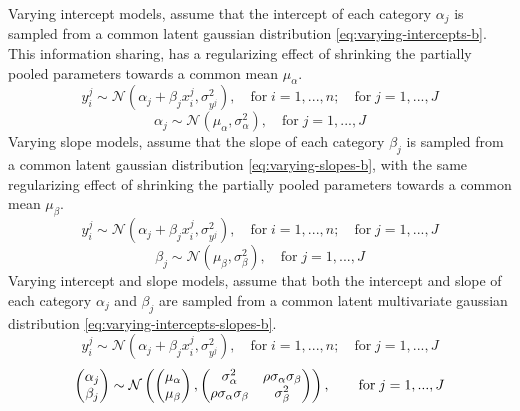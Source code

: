 \documentclass[english,msc,numbers]{coppe}
\begin{document}
  Varying intercept models, assume that the intercept of each category \(\alpha_j\) is sampled from a common latent gaussian distribution \eqref{eq:varying-intercepts-b}. This information sharing, has a regularizing effect of shrinking the partially pooled parameters towards a common mean \(\mu_\alpha\).
  \begin{equation} 
    y_i^j \sim \mathcal{N}(\alpha_j + \beta_j x_i^j, \sigma_{y^j}^2),\quad \text{for}\; i=1,...,n; \quad \text{for} \; j=1,...,J
    \label{eq:varying-intercepts-a}
  \end{equation}
  \begin{equation} 
    \alpha_j \sim \mathcal{N}(\mu_\alpha, \sigma_\alpha^2), \quad \text{for} \; j=1,...,J
    \label{eq:varying-intercepts-b}
  \end{equation}
  Varying slope models, assume that the slope of each category \(\beta_j\) is sampled from a common latent gaussian distribution \eqref{eq:varying-slopes-b}, with the same regularizing effect of shrinking the partially pooled parameters towards a common mean \(\mu_\beta\).
  \begin{equation} 
    y_i^j \sim \mathcal{N}(\alpha_j + \beta_j x_i^j, \sigma_{y^j}^2),\quad \text{for}\; i=1,...,n; \quad \text{for} \; j=1,...,J
    \label{eq:varying-slopes-a}
  \end{equation}
  \begin{equation} 
    \beta_j \sim \mathcal{N}(\mu_\beta, \sigma_\beta^2), \quad \text{for} \; j=1,...,J
    \label{eq:varying-slopes-b}
  \end{equation}
  Varying intercept and slope models, assume that both the intercept and slope of each category \(\alpha_j\) and \(\beta_j\) are sampled from a common latent multivariate gaussian distribution \eqref{eq:varying-intercepts-slopes-b}.
  \begin{equation} 
    y_i^j \sim \mathcal{N}(\alpha_j + \beta_j x_i^j, \sigma_{y^j}^2),\quad \text{for}\; i=1,...,n; \quad \text{for} \; j=1,...,J
    \label{eq:varying-intercepts-slopes-a}
  \end{equation}
  \begin{equation} 
    \begin{pmatrix}
    \alpha_j \\
    \beta_j
    \end{pmatrix} \sim \mathcal{N}\left(\begin{pmatrix}
    \mu_\alpha \\
    \mu_\beta
    \end{pmatrix},\begin{pmatrix}
    \sigma_\alpha^2 & \rho \sigma_\alpha \sigma_\beta \\
    \rho \sigma_\alpha \sigma_\beta & \sigma_\beta^2
    \end{pmatrix}\right),\quad \text \quad \text{for} \; j=1,...,J
    \label{eq:varying-intercepts-slopes-b}
  \end{equation}
\end{document}
